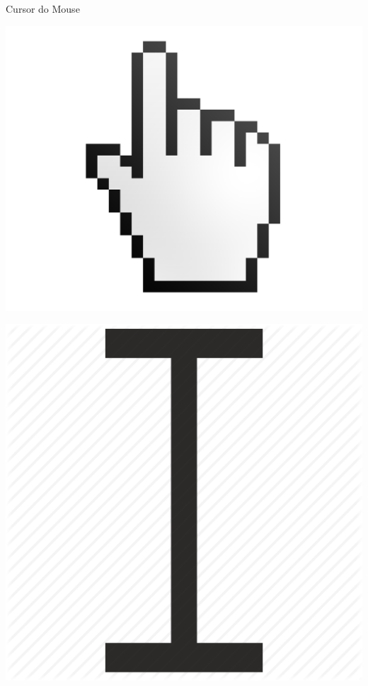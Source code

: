 \begin{frame}{Cursor do Mouse}
\begin{minipage}{0.24\linewidth}
		\includegraphics[width=1\linewidth]{Figuras/Ch02/fig17}
	\end{minipage}\hfill
	\begin{minipage}{0.24\linewidth}
		\centering
		\includegraphics[width=0.7\linewidth]{Figuras/Ch02/fig18}
	\end{minipage}

\end{frame}


